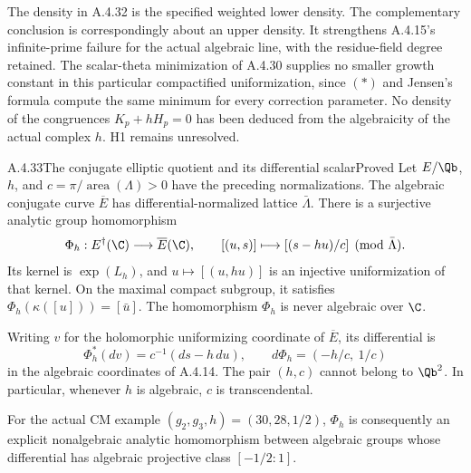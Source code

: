 The density in A.4.32 is the specified weighted lower density.
The complementary conclusion is correspondingly about an upper
density. It strengthens A.4.15's infinite-prime failure for the
actual algebraic line, with the residue-field degree retained.
The scalar-theta minimization of A.4.30 supplies no smaller growth
constant in this particular compactified uniformization, since
$(*)$ and Jensen's formula compute the same minimum for every
correction parameter. No density of the congruences
$K_p+hH_p=0$ has been deduced from the algebraicity of the actual
complex $h$. H1 remains unresolved.

\begin{result}{A.4.33}{The conjugate elliptic quotient and its differential scalar}{Proved}
Let $E/\Qb$, $h$, and $c=\pi/\operatorname{area}(\Lambda)>0$
have the preceding normalizations. The algebraic conjugate curve
$\overline E$ has differential-normalized lattice $\bar\Lambda$.
There is a surjective analytic group homomorphism
\[
 \Phi_h:E^\dagger(\C)\longrightarrow\overline E(\C),
 \qquad [(u,s)]\longmapsto[(s-hu)/c]\pmod{\bar\Lambda}.
\]
Its kernel is $\exp(L_h)$, and $u\mapsto[(u,hu)]$ is an
injective uniformization of that kernel. On the maximal compact
subgroup, it satisfies
$\Phi_h(\kappa([u]))=[\bar u]$.
The homomorphism $\Phi_h$ is never algebraic over $\C$.

Writing $v$ for the holomorphic uniformizing coordinate of
$\overline E$, its differential is
\[
 \Phi_h^*(dv)=c^{-1}(ds-h\,du),
 \qquad d\Phi_h=(-h/c,\ 1/c)
\]
in the algebraic coordinates of A.4.14. The pair $(h,c)$
cannot belong to $\Qb^2$. In particular, whenever $h$ is
algebraic, $c$ is transcendental.

For the actual CM example $(g_2,g_3,h)=(30,28,1/2)$,
$\Phi_h$ is consequently an explicit nonalgebraic analytic
homomorphism between algebraic groups whose differential has
algebraic projective class $[-1/2:1]$.
\end{result}
